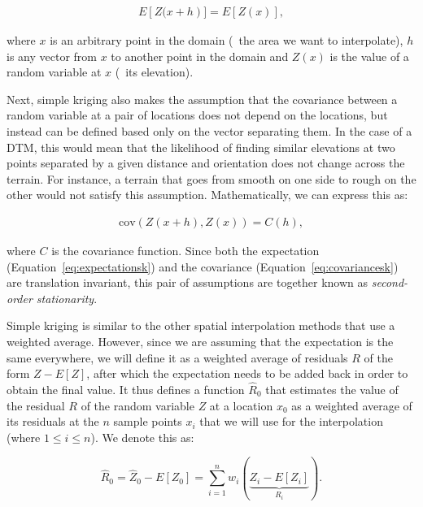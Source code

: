 \begin{align}
\label{eq:expectationsk}
E\left[Z(x+h\right)] = E\left[Z(x)\right],
\end{align}

where \(x\) is an arbitrary point in the domain (\ie\ the area we want to interpolate), \(h\) is any vector from \(x\) to another point in the domain and \(Z(x)\) is the value of a random variable at \(x\) (\eg\ its elevation).

Next, simple kriging also makes the assumption that the covariance between a random variable at a pair of locations does not depend on the locations, but instead can be defined based only on the vector separating them.
In the case of a DTM, this would mean that the likelihood of finding similar elevations at two points separated by a given distance and orientation does not change across the terrain.
For instance, a terrain that goes from smooth on one side to rough on the other would not satisfy this assumption.
Mathematically, we can express this as:

\begin{align}
\label{eq:covariancesk}
\mathrm{cov}\left(Z(x+h), Z(x)\right) = C(h),
\end{align}

where \(C\) is the covariance function.
Since both the expectation (Equation~\ref{eq:expectationsk}) and the covariance (Equation~\ref{eq:covariancesk}) are translation invariant, this pair of assumptions are together known as \emph{second-order stationarity}.

Simple kriging is similar to the other spatial interpolation methods that use a weighted average.
However, since we are assuming that the expectation is the same everywhere, we will define it as a weighted average of residuals \(R\) of the form \(Z-E[Z]\), after which the expectation needs to be added back in order to obtain the final value.
It thus defines a function \(\hat{R}_0\) that estimates the value of the residual \(R\) of the random variable \(Z\) at a location \(x_0\) as a weighted average of its residuals at the \(n\) sample points \(x_i\) that we will use for the interpolation (where \(1 \leq i \leq n\)).
We denote this as:

\begin{equation}
\label{eq:wask}
\hat{R}_0 = \hat{Z}_0 - E[Z_0] = \sum_{i=1}^n w_i (\underbrace{Z_i-E[Z_i]}_{R_i}).
\end{equation}

